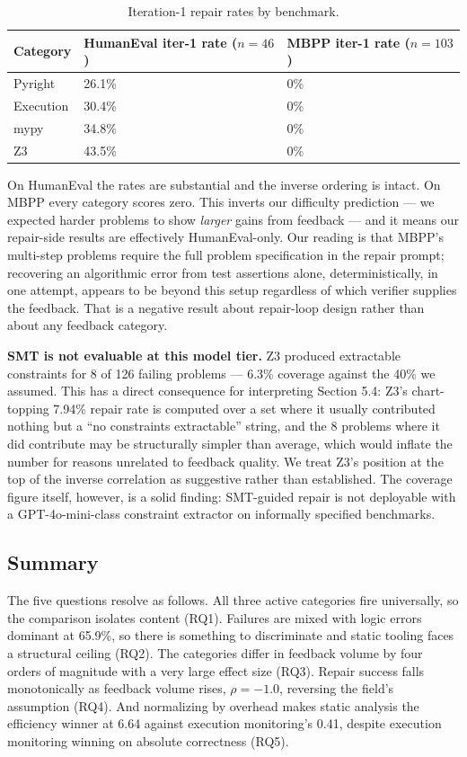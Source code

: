 \begin{table}[h]
\centering
\caption{Iteration-1 repair rates by benchmark.}
\label{tab:benchmark_split}
\begin{tabular}{lll}
\toprule
Category & HumanEval iter-1 rate ($n=46$) & MBPP iter-1 rate ($n=103$) \\
\midrule
Pyright & 26.1\% & 0\% \\
Execution & 30.4\% & 0\% \\
mypy & 34.8\% & 0\% \\
Z3 & 43.5\% & 0\% \\
\bottomrule
\end{tabular}
\end{table}

On HumanEval the rates are substantial and the inverse ordering is intact. On MBPP every category scores zero. This inverts our difficulty prediction --- we expected harder problems to show \textit{larger} gains from feedback --- and it means our repair-side results are effectively HumanEval-only. Our reading is that MBPP's multi-step problems require the full problem specification in the repair prompt; recovering an algorithmic error from test assertions alone, deterministically, in one attempt, appears to be beyond this setup regardless of which verifier supplies the feedback. That is a negative result about repair-loop design rather than about any feedback category.

\textbf{SMT is not evaluable at this model tier.} Z3 produced extractable constraints for 8 of 126 failing problems --- 6.3\% coverage against the 40\% we assumed. This has a direct consequence for interpreting Section 5.4: Z3's chart-topping 7.94\% repair rate is computed over a set where it usually contributed nothing but a ``no constraints extractable'' string, and the 8 problems where it did contribute may be structurally simpler than average, which would inflate the number for reasons unrelated to feedback quality. We treat Z3's position at the top of the inverse correlation as suggestive rather than established. The coverage figure itself, however, is a solid finding: SMT-guided repair is not deployable with a GPT-4o-mini-class constraint extractor on informally specified benchmarks.

\subsection{Summary}

The five questions resolve as follows. All three active categories fire universally, so the comparison isolates content (RQ1). Failures are mixed with logic errors dominant at 65.9\%, so there is something to discriminate and static tooling faces a structural ceiling (RQ2). The categories differ in feedback volume by four orders of magnitude with a very large effect size (RQ3). Repair success falls monotonically as feedback volume rises, $\rho = -1.0$, reversing the field's assumption (RQ4). And normalizing by overhead makes static analysis the efficiency winner at 6.64 against execution monitoring's 0.41, despite execution monitoring winning on absolute correctness (RQ5).

